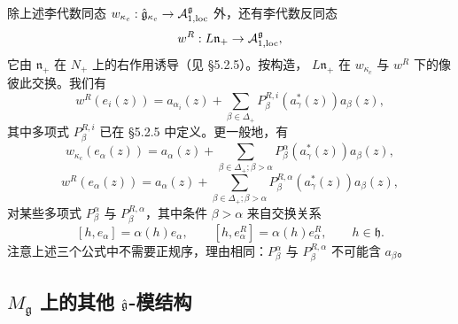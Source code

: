 除上述李代数同态 $w_{\kappa_c}:\hat{\mathfrak{g}}_{\kappa_c}\to
\mathcal{A}^{\mathfrak g}_{1,\mathrm{loc}}$ 外，还有李代数反同态
\[
    w^R:L\mathfrak n_+\to\mathcal{A}^{\mathfrak g}_{1,\mathrm{loc}},
\]
它由 $\mathfrak n_+$ 在 $N_+$ 上的右作用诱导（见 \S5.2.5）。按构造，
$L\mathfrak n_+$ 在 $w_{\kappa_c}$ 与 $w^R$ 下的像彼此交换。我们有
\begin{equation}
    w^R(e_i(z))=a_{\alpha_i}(z)+\sum_{\beta\in\Delta_+}
    P^{R,i}_\beta(a^*_\gamma(z))a_\beta(z),
    \tag{6.1-1}
\end{equation}
其中多项式 $P^{R,i}_\beta$ 已在 \S5.2.5 中定义。更一般地，有
\begin{equation}
    w_{\kappa_c}(e_\alpha(z))=a_\alpha(z)+\sum_{\beta\in\Delta_+;\beta>\alpha}
    P^\alpha_\beta(a^*_\gamma(z))a_\beta(z),
    \tag{6.1-2}
\end{equation}
\begin{equation}
    w^R(e_\alpha(z))=a_\alpha(z)+\sum_{\beta\in\Delta_+;\beta>\alpha}
    P^{R,\alpha}_\beta(a^*_\gamma(z))a_\beta(z),
    \tag{6.1-3}
\end{equation}
对某些多项式 $P^\alpha_\beta$ 与 $P^{R,\alpha}_\beta$，其中条件
$\beta>\alpha$ 来自交换关系
\[
    [h,e_\alpha]=\alpha(h)e_\alpha,\qquad
    [h,e^R_\alpha]=\alpha(h)e^R_\alpha,\qquad h\in\mathfrak h.
\]
注意上述三个公式中不需要正规序，理由相同：$P^\alpha_\beta$ 与
$P^{R,\alpha}_\beta$ 不可能含 $a_\beta$。

\subsection{$M_{\mathfrak g}$ 上的其他 $\hat{\mathfrak{g}}$-模结构}

